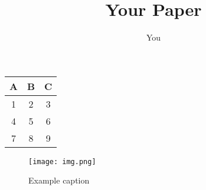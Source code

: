 \documentclass{article}
\title{Your Paper}
\author{You}
\begin{document}
    
    \begin{tabular}{c|c|c}
A & B & C\\
\hline
1 & 2 & 3\\
\hline
4 & 5 & 6\\
\hline
7 & 8 & 9\\
\end{tabular}
    
    \begin{figure}[ht]\centering
\texttt{[image: img.png]}
\label{exampleLabel}
\caption{Example caption}
\end{figure}
    
    
\end{document}
